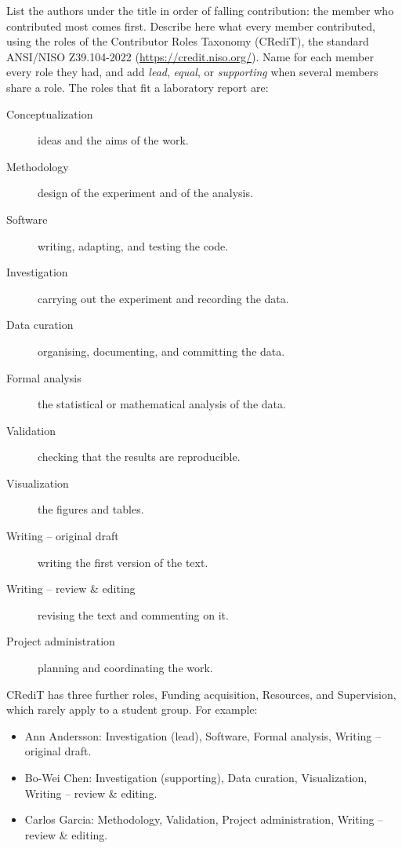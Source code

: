 \documentclass[10pt,a4paper,twocolumn]{article}
\begin{document}
List the authors under the title in order of falling contribution: the member who contributed most comes first.
Describe here what every member contributed, using the roles of the Contributor Roles Taxonomy (CRediT), the standard ANSI/NISO Z39.104-2022 (\url{https://credit.niso.org/}).
Name for each member every role they had, and add \emph{lead}, \emph{equal}, or \emph{supporting} when several members share a role.
The roles that fit a laboratory report are:
\begin{description}
  \item[Conceptualization] ideas and the aims of the work.
  \item[Methodology] design of the experiment and of the analysis.
  \item[Software] writing, adapting, and testing the code.
  \item[Investigation] carrying out the experiment and recording the data.
  \item[Data curation] organising, documenting, and committing the data.
  \item[Formal analysis] the statistical or mathematical analysis of the data.
  \item[Validation] checking that the results are reproducible.
  \item[Visualization] the figures and tables.
  \item[Writing -- original draft] writing the first version of the text.
  \item[Writing -- review \& editing] revising the text and commenting on it.
  \item[Project administration] planning and coordinating the work.
\end{description}
CRediT has three further roles, Funding acquisition, Resources, and Supervision, which rarely apply to a student group.
For example:
\begin{itemize}
  \item Ann Andersson: Investigation (lead), Software, Formal analysis, Writing -- original draft.
  \item Bo-Wei Chen: Investigation (supporting), Data curation, Visualization, Writing -- review \& editing.
  \item Carlos Garcia: Methodology, Validation, Project administration, Writing -- review \& editing.
\end{itemize}

\printbibliography
\end{document}
